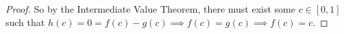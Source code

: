 \documentclass[12pt,letterpaper]{article}
\begin{document}
\begin{enumerate}
\begin{enumerate}
\begin{proof}
            So by the Intermediate Value Theorem, there must exist some $c \in [0, 1]$
            such that $h(c) = 0 = f(c) - g(c) \implies f(c) = g(c) \implies f(c) = c$.
          \end{proof}
      \end{enumerate}
  \end{enumerate}
\end{document}
